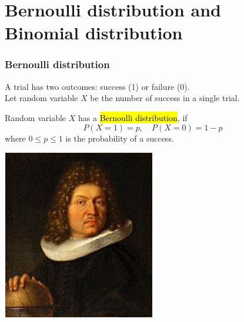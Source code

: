 \documentclass[slidestop,compress,mathserif]{beamer}
\begin{document}
\section{Bernoulli distribution and Binomial distribution}
\begin{frame}\frametitle{Bernoulli distribution}

A trial has two outcomes: success (1) or failure (0). \\
Let random variable $X$ be the number of success in a single trial.

\begin{defn}
Random variable $X$
has a \hl{Bernoulli distribution}, if
\[
P(X = 1) = p, \quad P(X = 0) = 1-p
\]
where $0 \leq p \leq 1$ is the probability of a success.
\end{defn}

{
\begin{center}
\includegraphics[width = \textwidth]{figures/Jacob_Bernoulli}
\end{center}
}

\end{frame}
\end{document}
